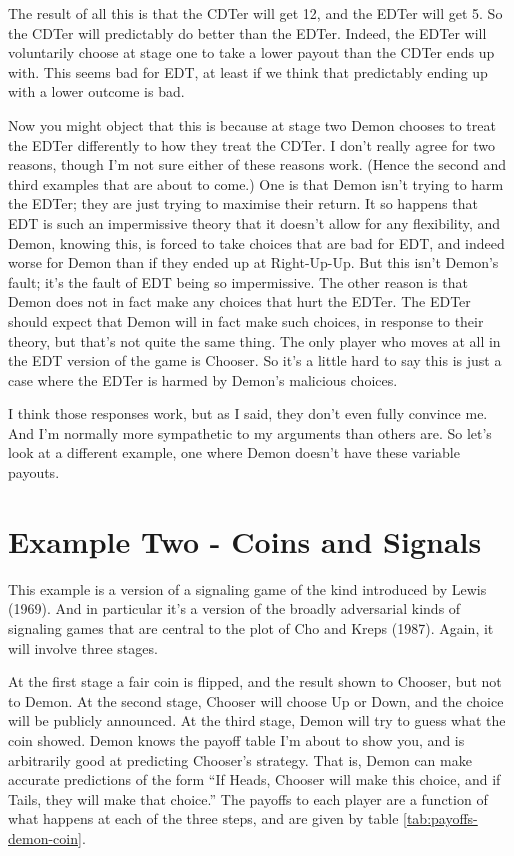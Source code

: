 \documentclass[
  12pt,
]{article}
\begin{document}
The result of all this is that the CDTer will get 12, and the EDTer will get 5. So the CDTer will predictably do better than the EDTer. Indeed, the EDTer will voluntarily choose at stage one to take a lower payout than the CDTer ends up with. This seems bad for EDT, at least if we think that predictably ending up with a lower outcome is bad.

Now you might object that this is because at stage two Demon chooses to treat the EDTer differently to how they treat the CDTer. I don't really agree for two reasons, though I'm not sure either of these reasons work. (Hence the second and third examples that are about to come.) One is that Demon isn't trying to harm the EDTer; they are just trying to maximise their return. It so happens that EDT is such an impermissive theory that it doesn't allow for any flexibility, and Demon, knowing this, is forced to take choices that are bad for EDT, and indeed worse for Demon than if they ended up at Right-Up-Up. But this isn't Demon's fault; it's the fault of EDT being so impermissive. The other reason is that Demon does not in fact make any choices that hurt the EDTer. The EDTer should expect that Demon will in fact make such choices, in response to their theory, but that's not quite the same thing. The only player who moves at all in the EDT version of the game is Chooser. So it's a little hard to say this is just a case where the EDTer is harmed by Demon's malicious choices.

I think those responses work, but as I said, they don't even fully convince me. And I'm normally more sympathetic to my arguments than others are. So let's look at a different example, one where Demon doesn't have these variable payouts.

\hypertarget{coinssignals}{%
\section{Example Two - Coins and Signals}\label{coinssignals}}

This example is a version of a signaling game of the kind introduced by Lewis (1969). And in particular it's a version of the broadly adversarial kinds of signaling games that are central to the plot of Cho and Kreps (1987). Again, it will involve three stages.

At the first stage a fair coin is flipped, and the result shown to Chooser, but not to Demon. At the second stage, Chooser will choose Up or Down, and the choice will be publicly announced. At the third stage, Demon will try to guess what the coin showed. Demon knows the payoff table I'm about to show you, and is arbitrarily good at predicting Chooser's strategy. That is, Demon can make accurate predictions of the form ``If Heads, Chooser will make this choice, and if Tails, they will make that choice.'' The payoffs to each player are a function of what happens at each of the three steps, and are given by table \ref{tab:payoffs-demon-coin}.
\end{document}
